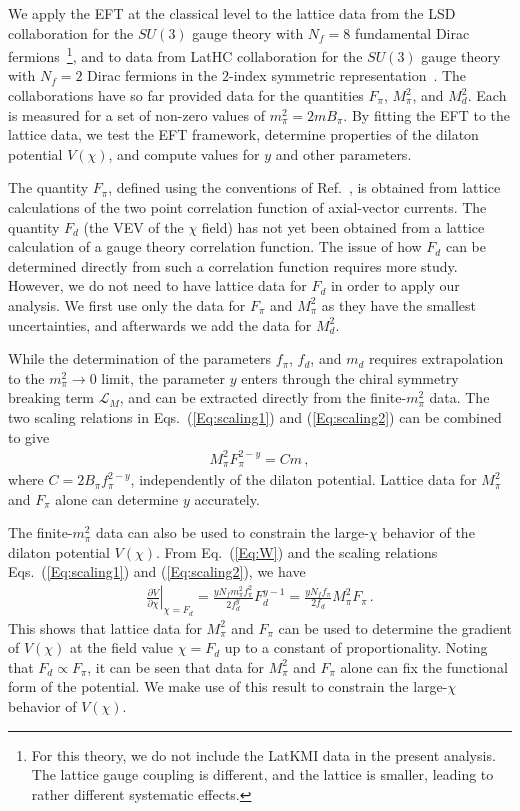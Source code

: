 \documentclass[a4paper,11pt]{article}
\newcommand{\beqs}{\begin{eqnarray}}
\newcommand{\eeqs}{\end{eqnarray}}
\begin{document}
We apply the EFT at the classical level to the lattice data from the LSD collaboration for the $SU(3)$ gauge theory with $N_f = 8$ fundamental Dirac fermions~\cite{LSD}\footnote{For this theory, we do not include the LatKMI data \cite{LatKMI,LatKMI2} in the present analysis. The lattice gauge coupling is different, and the lattice is smaller, leading to rather different systematic effects.}, and to data from LatHC collaboration for the $SU(3)$ gauge theory with $N_f = 2$ Dirac fermions in the $2$-index symmetric representation~\cite{FHKNSW,FHKMNW,FHKMNW2}. The collaborations have so far provided data for the quantities $F_{\pi}$, $M_{\pi}^2$, and $M_d^2$. Each is measured for a set of non-zero values of $m_{\pi}^2 = 2 m B_{\pi}$. By fitting the EFT to the lattice data, we test the EFT framework, determine properties of the dilaton potential $V(\chi)$, and compute values for $y$ and other parameters.

The quantity $F_\pi$, defined using the conventions of Ref.~\cite{LSD}, is obtained from lattice calculations of the two point correlation function of axial-vector currents. The quantity $F_d$ (the VEV of the $\chi$ field) has not yet been obtained from a lattice calculation of a gauge theory correlation function. The issue of how $F_d$ can be determined directly from such a correlation function requires more study. However, we do not need to have lattice data for $F_d$ in order to apply our analysis. We first use only the data for $F_\pi$ and $M^2_\pi$ as they have the smallest uncertainties, and afterwards we add the data for $M^2_d$.


While the determination of the parameters $f_{\pi}$, $f_d$, and $m_d$ requires extrapolation to the $m^2_\pi\rightarrow0$ limit, the parameter $y$ enters through the chiral symmetry breaking term $\mathcal{L}_M$, and can be extracted directly from the finite-$m_{\pi}^2$ data. The two scaling relations in Eqs.~(\ref{Eq:scaling1}) and (\ref{Eq:scaling2}) can be combined to give  
\beqs
M_{\pi}^2 F_{\pi}^{2-y} = C m \,,
\label{Eq:y}
\eeqs
where $C = 2 B_{\pi} f_{\pi}^{2-y}$, independently of the dilaton potential. Lattice data for $M_{\pi}^2$ and $F_{\pi}$ alone can determine $y$ accurately. 

The finite-$m_{\pi}^2$ data can also be used to constrain the large-$\chi$ behavior of the dilaton potential $V(\chi)$. From Eq.~(\ref{Eq:W}) and the scaling relations Eqs.~(\ref{Eq:scaling1}) and (\ref{Eq:scaling2}), we have 
\beqs
\left. \frac{\partial V}{ \partial \chi}\right|_{\chi = F_d} = \frac{yN_{f}m_{\pi}^2f_{\pi}^2}{2f{_d^y}} F_{d}^{y-1} = \frac{yN_{f}f_\pi}{2f{_d}} M_{\pi}^{2} F_{\pi}\, .
\label{Eq:dV}
\eeqs
This shows that lattice data for $M^2_\pi$ and $F_\pi$ can be used to determine the gradient of $V(\chi)$ at the field value $\chi=F_d$ up to a constant of proportionality. Noting that $F_d\propto F_\pi$, it can be seen that data for $M^2_\pi$ and $F_\pi$ alone can fix the functional form of the potential. We make use of this result to constrain the large-$\chi$ behavior of $V(\chi)$.
\end{document}
